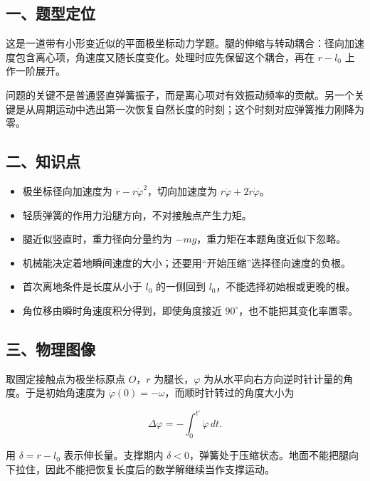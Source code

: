 \documentclass[12pt,a4paper,fontset=fandol]{ctexart}
\providecommand{\tightlist}{\setlength{\itemsep}{0pt}\setlength{\parskip}{0pt}}
\begin{document}
\subsection{一、题型定位}\label{ux4e00ux9898ux578bux5b9aux4f4d-1}

这是一道带有小形变近似的平面极坐标动力学题。腿的伸缩与转动耦合：径向加速度包含离心项，角速度又随长度变化。处理时应先保留这个耦合，再在
\(r-l_0\) 上作一阶展开。

问题的关键不是普通竖直弹簧振子，而是离心项对有效振动频率的贡献。另一个关键是从周期运动中选出第一次恢复自然长度的时刻；这个时刻对应弹簧推力刚降为零。

\subsection{二、知识点}\label{ux4e8cux77e5ux8bc6ux70b9-1}

\begin{itemize}
\tightlist
\item
  极坐标径向加速度为 \(\ddot r-r\dot\varphi^2\)，切向加速度为
  \(r\ddot\varphi+2\dot r\dot\varphi\)。
\item
  轻质弹簧的作用力沿腿方向，不对接触点产生力矩。
\item
  腿近似竖直时，重力径向分量约为 \(-mg\)，重力矩在本题角度近似下忽略。
\item
  机械能决定着地瞬间速度的大小；还要用``开始压缩''选择径向速度的负根。
\item
  首次离地条件是长度从小于 \(l_0\) 的一侧回到
  \(l_0\)，不能选择初始根或更晚的根。
\item
  角位移由瞬时角速度积分得到，即使角度接近
  \(90^\circ\)，也不能把其变化率置零。
\end{itemize}

\subsection{三、物理图像}\label{ux4e09ux7269ux7406ux56feux50cf-1}

取固定接触点为极坐标原点 \(O\)，\(r\) 为腿长，\(\varphi\)
为从水平向右方向逆时针计量的角度。于是初始角速度为
\(\dot\varphi(0)=-\omega\)，而顺时针转过的角度大小为

\[
\Delta\varphi=-\int_0^{t'}\dot\varphi\,dt.
\]

用 \(\delta=r-l_0\) 表示伸长量。支撑期内
\(\delta<0\)，弹簧处于压缩状态。地面不能把腿向下拉住，因此不能把恢复长度后的数学解继续当作支撑运动。
\end{document}
